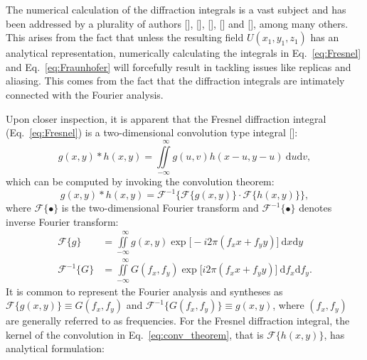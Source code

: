 \begin{refsection}
The numerical calculation of the diffraction integrals is a vast subject and has been addressed by a plurality of authors [\cite{DArcio:94}], [\cite{Kelly2014}], [\cite[\textit{§5}]{Goodman2017}], [\cite{Buitrago-Duque:19}] and [\cite{Chubar2019}], among many others. This arises from the fact that unless the resulting field $U(x_1,y_1,z_1)$ has an analytical representation, numerically calculating the integrals in Eq.~\ref{eq:Fresnel} and Eq.~\ref{eq:Fraunhofer} will forcefully result in tackling issues like replicas and aliasing. This comes from the fact that the diffraction integrals are intimately connected with the Fourier analysis. 

Upon closer inspection, it is apparent that the Fresnel diffraction integral (Eq.~\ref{eq:Fresnel}) is a two-dimensional convolution type integral [\cite[\textit{§2.1}]{Goodman2017}]:
\begin{equation}\label{eq:conv}
    g(x,y) * h(x,y) = \iint\limits_{-\infty}^{\hspace{8pt}\infty}{g(u,v)h(x-u,y-u)~\mathrm{d}u\mathrm{d}v},
\end{equation}{}
which can be computed by invoking the convolution theorem:
\begin{equation}\label{eq:conv_theorem}
    g(x,y) * h(x,y) = \mathcal{F}^{-1}\big\{\mathcal{F}\{g(x,y)\}\cdot\mathcal{F}\{h(x,y)\}\big\},
\end{equation}{}
where $\mathcal{F}\{\bullet\}$ is the two-dimensional Fourier transform and $\mathcal{F}^{-1}\{\bullet\}$ denotes inverse Fourier transform:
\begin{subequations}\label{eq:Fourier}
    \begin{align}
        \mathcal{F}\{g\} &= \iint\limits_{-\infty}^{\hspace{8pt}\infty}{g(x,y)\exp{\big[-i2\pi(f_xx+f_yy)\big]}~\mathrm{d}x\mathrm{d}y}\\
        \mathcal{F}^{-1}\{G\} &=\iint\limits_{-\infty}^{\hspace{8pt}\infty}{G(f_x,f_y)\exp{\big[i2\pi(f_xx+f_yy)\big]}~\mathrm{d}f_x\mathrm{d}f_y}.
    \end{align}
\end{subequations}{}
It is common to represent the Fourier analysis and syntheses as $\mathcal{F}\{g(x,y)\}\equiv G(f_x,f_y)$ and $\mathcal{F}^{-1}\{G(f_x,f_y)\}\equiv g(x,y)$, where $(f_x,f_y)$ are generally referred to as frequencies. For the Fresnel diffraction integral, the kernel of the convolution in Eq.~\ref{eq:conv_theorem}, that is $\mathcal{F}\{h(x,y)\}$, has analytical formulation:

\end{refsection}
